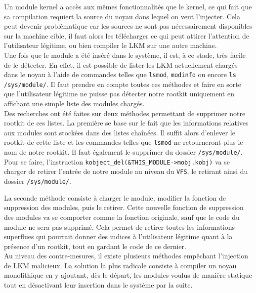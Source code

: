 \documentclass[12pt]{article}
\begin{document}
        Un module kernel a accès aux mêmes fonctionnalités que le kernel, ce qui fait que sa compilation requiert la source du noyau dans lequel on veut l'injecter. Cela peut devenir problématique car les sources ne sont pas nécessairement disponibles sur la machine cible, il faut alors les télécharger ce qui peut attirer l'attention de l'utilisateur légitime, ou bien compiler le LKM sur une autre machine. \\
        
        Une fois que le module a été inséré dans le système, il est, à ce stade, très facile de le détecter. En effet, il est possible de lister les LKM actuellement chargés dans le noyau à l'aide de commandes telles que \texttt{lsmod}, \texttt{modinfo} ou encore \texttt{ls /sys/module/}. Il faut prendre en compte toutes ces méthodes et faire en sorte que l'utilisateur légitime ne puisse pas détecter notre rootkit uniquement en affichant une simple liste des modules chargés. \\

        Des recherches ont été faites sur deux méthodes permettant de supprimer notre rootkit de ces listes. La première se base sur le fait que les informations relatives aux modules sont stockées dans des listes chaînées. Il suffit alors d'enlever le rootkit de cette liste et les commandes telles que \texttt{lsmod} ne retourneront plus le nom de notre rootkit. Il faut également le supprimer du dossier \texttt{/sys/module/}. Pour se faire, l'instruction \texttt{kobject\_del(\&THIS\_MODULE->mobj.kobj)} va se charger de retirer l'entrée de notre module au niveau du \texttt{VFS}, le retirant ainsi du dossier \texttt{/sys/module/}.

        La seconde méthode consiste à charger le module, modifier la fonction de suppression des modules, puis le retirer\cite{spacelkm}. Cette nouvelle fonction de suppression des modules va se comporter comme la fonction originale, sauf que le code du module ne sera pas supprimé. Cela permet de retirer toutes les informations superflues qui pourrait donner des indices à l'utilisateur légitime quant à la présence d'un rootkit, tout en gardant le code de ce dernier. \\
        
        Au niveau des contre-mesures, il existe plusieurs méthodes empêchant l'injection de LKM malicieux. La solution la plus radicale consiste à compiler un noyau monolithique en y ajoutant, dès le départ, les modules voulus de manière statique tout en désactivant leur insertion dans le système par la suite.
\end{document}
